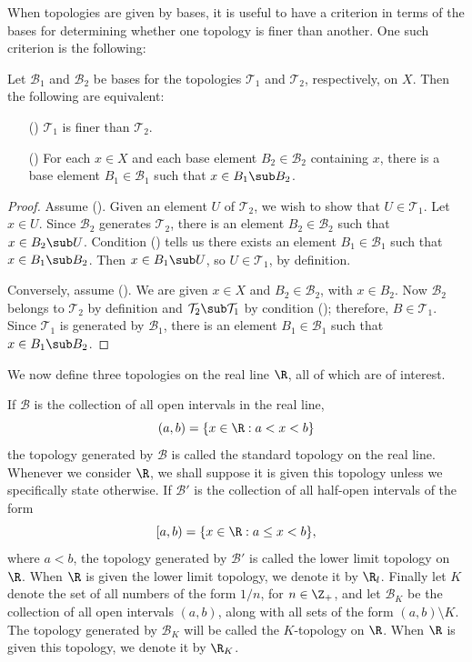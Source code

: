 When topologies are given by bases, it is useful to have a criterion in terms of the bases for determining whether one topology is finer than another. One such criterion is the following:
\begin{proposition}
Let $\mathcal{B}_1$ and $\mathcal{B}_2$ be bases for the topologies $\mathcal{T}_1$ and $\mathcal{T}_2$, respectively, on $X$. Then the following are equivalent:
\begin{itemize}
\item[(\rmnum{1})] $\mathcal{T}_1$ is finer than $\mathcal{T}_2$.
\item[(\rmnum{2})] For each $x\in X$ and each base element $B_2\in\mathcal{B}_2$ containing $x$, there is a base element $B_1\in\mathcal{B}_1$ such that $x\in B_1\sub B_2$.
\end{itemize}
\end{proposition}
\begin{proof}
Assume (). Given an element $U$ of $\mathcal{T}_2$, we wish to show that $U\in\mathcal{T}_1$. Let $x\in U$. Since $\mathcal{B}_2$ generates $\mathcal{T}_2$, there is an element $B_2\in\mathcal{B}_2$ such that $x\in B_2\sub U$. Condition () tells us there exists an element $B_1\in\mathcal{B}_1$ such that $x\in B_1\sub B_2$. Then $x\in B_1\sub U$, so $U\in\mathcal{T}_1$, by definition.\par
Conversely, assume (). We are given $x\in X$ and $B_2\in\mathcal{B}_2$, with $x\in B_2$. Now $\mathcal{B}_2$ belongs to $\mathcal{T}_2$ by definition and $\mathcal{T}_2\sub\mathcal{T}_1$ by condition (); therefore, $B\in\mathcal{T}_1$. Since $\mathcal{T}_1$ is generated by $\mathcal{B}_1$, there is an element $B_1\in\mathcal{B}_1$ such that $x\in B_1\sub B_2$.
\end{proof}
We now define three topologies on the real line $\R$, all of which are of interest.
\begin{example}
If $\mathcal{B}$ is the collection of all open intervals in the real line,
\[(a,b)=\{x\in\R:a<x<b\}\]
the topology generated by $\mathcal{B}$ is called the standard topology on the real line. Whenever we consider $\R$, we shall suppose it is given this topology unless we specifically state otherwise. If $\mathcal{B}'$ is the collection of all half-open intervals of the form
\[[a,b)=\{x\in\R:a\leq x<b\},\]
where $a<b$, the topology generated by $\mathcal{B}'$ is called the lower limit topology on $\R$. When $\R$ is given the lower limit topology, we denote it by $\R_l$. Finally let $K$ denote the set of all numbers of the form $1/n$, for $n\in\Z_+$, and let $\mathcal{B}_K$ be the collection of all open intervals $(a,b)$, along with all sets of the form $(a,b)\setminus K$. The topology generated by $\mathcal{B}_K$ will be called the $K$-topology on $\R$. When $\R$ is given this topology, we denote it by $\R_K$.
\end{example}
